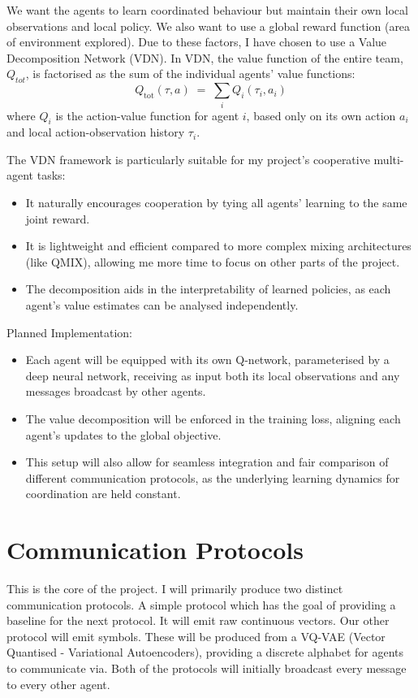 \documentclass[20pt]{article}
\begin{document}
We want the agents to learn coordinated behaviour but maintain their own local observations and local policy. We also want to use a global reward function (area of environment explored). Due to these factors, I have chosen to use a Value Decomposition Network (VDN).
In VDN, the value function of the entire team, $Q_{tot}$, is factorised as the sum of the individual agents' value functions:
\[
Q_{\mathrm{tot}}(\tau, a) \;=\; \sum_{i} Q_{i}(\tau_{i}, a_{i})
\]
where $Q_i$ is the action-value function for agent $i$, based only on its own action $a_i$ and local action-observation history $\tau_i$.

The VDN framework is particularly suitable for my project’s cooperative multi-agent tasks:
\begin{itemize}
\item It naturally encourages cooperation by tying all agents’ learning to the same joint reward.
\item It is lightweight and efficient compared to more complex mixing architectures (like QMIX), allowing me more time to focus on other parts of the project.
\item The decomposition aids in the interpretability of learned policies, as each agent’s value estimates can be analysed independently.
\end{itemize}

Planned Implementation:
\begin{itemize}
\item Each agent will be equipped with its own Q-network, parameterised by a deep neural network, receiving as input both its local observations and any messages broadcast by other agents.
\item The value decomposition will be enforced in the training loss, aligning each agent’s updates to the global objective.
\item This setup will also allow for seamless integration and fair comparison of different communication protocols, as the underlying learning dynamics for coordination are held constant.
\end{itemize}

\section*{Communication Protocols}
This is the core of the project. I will primarily produce two distinct communication protocols. A simple protocol which has the goal of providing a baseline for the next protocol. It will emit raw continuous vectors. Our other protocol will emit symbols. These will be produced from a VQ-VAE (Vector Quantised - Variational Autoencoders), providing a discrete alphabet for agents to communicate via. Both of the protocols will initially broadcast every message to every other agent.
\end{document}
